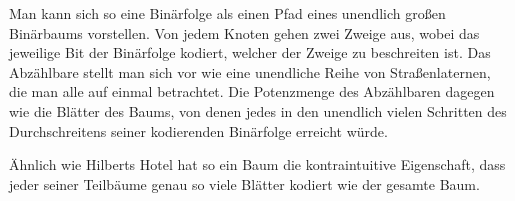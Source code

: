 Man kann sich so eine Binärfolge als einen Pfad eines unendlich großen
Binärbaums vorstellen. Von jedem Knoten gehen zwei Zweige aus, wobei
das jeweilige Bit der Binärfolge kodiert, welcher der Zweige zu
beschreiten ist. Das Abzählbare stellt man sich vor wie eine
unendliche Reihe von Straßenlaternen, die man alle auf einmal
betrachtet. Die Potenzmenge des Abzählbaren dagegen wie die Blätter
des Baums, von denen jedes in den unendlich vielen Schritten des
Durchschreitens seiner kodierenden Binärfolge erreicht würde.

Ähnlich wie Hilberts Hotel hat so ein Baum die kontraintuitive
Eigenschaft, dass jeder seiner Teilbäume genau so viele Blätter
kodiert wie der gesamte Baum.


